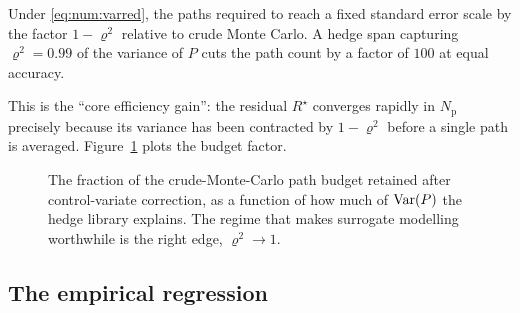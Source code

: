 \begin{corollary}\label{cor:num:budget}
Under \eqref{eq:num:varred}, the paths required to reach a fixed standard error
scale by the factor $1-\varrho^2$ relative to crude Monte Carlo. A hedge span
capturing $\varrho^2 = 0.99$ of the variance of $P$ cuts the path count by a
factor of $100$ at equal accuracy.
\end{corollary}

This is the ``core efficiency gain'': the residual $R^\star$ converges rapidly
in $N_{\mathrm{p}}$ precisely because its variance has been contracted by $1-\varrho^2$
before a single path is averaged. Figure~\ref{fig:num:varred} plots the budget
factor.

\begin{figure}[t]
\centering
{}
\caption{The fraction of the crude-Monte-Carlo path budget retained after
control-variate correction, as a function of how much of $\operatorname{Var}(P)$ the hedge
library explains. The regime that makes surrogate modelling worthwhile is the
right edge, $\varrho^2 \to 1$.}
\label{fig:num:varred}
\end{figure}

\subsection{The empirical regression}

